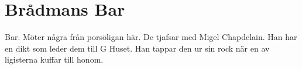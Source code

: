 \section{Brådmans Bar}
\label{loc:BradmansBar}
Bar. Möter några från porsöligan här. De tjafsar med Migel Chapdelain. Han har en dikt som leder dem till G Huset. Han tappar den ur sin rock när en av ligisterna kuffar till honom.

